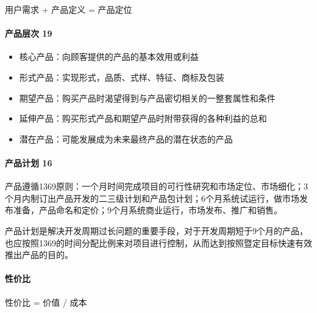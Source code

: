 \documentclass[letterpaper,10pt,english]{sphinxmanual}
\begin{document}
用户需求 + 产品定义 = 产品定位


\paragraph{产品层次 19\sphinxfootnotemark[55]}
\label{\detokenize{chapter_introduction/Product:id48}}%
\begin{footnotetext}[55]\sphinxAtStartFootnote
{}
%
\end{footnotetext}\ignorespaces \begin{itemize}
\item {} 
核心产品：向顾客提供的产品的基本效用或利益

\item {} 
形式产品：实现形式，品质、式样、特征、商标及包装

\item {} 
期望产品：购买产品时渴望得到与产品密切相关的一整套属性和条件

\item {} 
延伸产品：购买形式产品和期望产品时附带获得的各种利益的总和

\item {} 
潜在产品：可能发展成为未来最终产品的潜在状态的产品

\end{itemize}


\paragraph{产品计划 16\sphinxfootnotemark[56]}
\label{\detokenize{chapter_introduction/Product:id49}}%
\begin{footnotetext}[56]\sphinxAtStartFootnote
{}
%
\end{footnotetext}\ignorespaces 
产品遵循1\sphinxhyphen{}3\sphinxhyphen{}6\sphinxhyphen{}9原则：一个月时间完成项目的可行性研究和市场定位、市场细化；3个月内制订出产品开发的二三级计划和产品包计划；6个月系统试运行，做市场发布准备，产品命名和定价；9个月系统商业运行，市场发布、推广和销售。

产品计划是解决开发周期过长问题的重要手段，对于开发周期短于9个月的产品，也应按照1\sphinxhyphen{}3\sphinxhyphen{}6\sphinxhyphen{}9的时间分配比例来对项目进行控制，从而达到按照暨定目标快速有效推出产品的目的。


\paragraph{性价比}
\label{\detokenize{chapter_introduction/Product:id50}}
性价比 = 价值 / 成本
\end{document}
